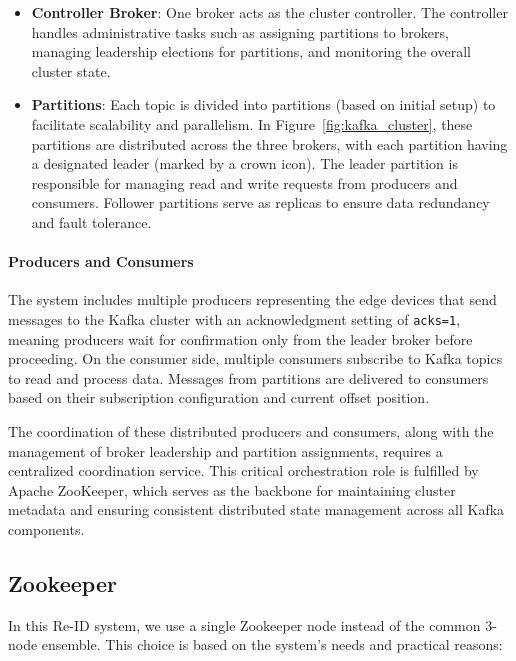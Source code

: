 \documentclass[../main.tex]{subfiles}
\begin{document}
\begin{itemize}
    \item \textbf{Controller Broker}: One broker acts as the cluster controller. The controller handles administrative tasks such as assigning partitions to brokers, managing leadership elections for partitions, and monitoring the overall cluster state.
    
    \item \textbf{Partitions}: Each topic is divided into partitions (based on initial setup) to facilitate scalability and parallelism. In Figure~\ref{fig:kafka_cluster}, these partitions are distributed across the three brokers, with each partition having a designated leader (marked by a crown icon). The leader partition is responsible for managing read and write requests from producers and consumers. Follower partitions serve as replicas to ensure data redundancy and fault tolerance.
\end{itemize}

\paragraph{Producers and Consumers}

The system includes multiple producers representing the edge devices that send messages to the Kafka cluster with an acknowledgment setting of \texttt{acks=1}, meaning producers wait for confirmation only from the leader broker before proceeding. On the consumer side, multiple consumers subscribe to Kafka topics to read and process data. Messages from partitions are delivered to consumers based on their subscription configuration and current offset position.

The coordination of these distributed producers and consumers, along with the management of broker leadership and partition assignments, requires a centralized coordination service. This critical orchestration role is fulfilled by Apache ZooKeeper, which serves as the backbone for maintaining cluster metadata and ensuring consistent distributed state management across all Kafka components.

\subsection{Zookeeper}

In this Re-ID system, we use a single Zookeeper node instead of the common 3-node ensemble. This choice is based on the system's needs and practical reasons:
\end{document}
